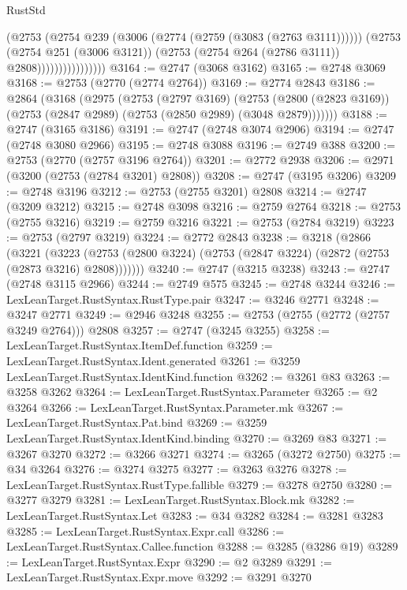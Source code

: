 \begin{lexlean}{RustStd}
\begin{coremodule}
                              (@2753
                                (@2754 @239 (@3006 (@2774 (@2759 (@3083 (@2763 @3111))))))
                                (@2753
                                  (@2754 @251 (@3006 @3121))
                                  (@2753 (@2754 @264 (@2786 @3111)) @2808))))))))))))))))
@3164 := @2747 (@3068 @3162)
@3165 := @2748 @3069
@3168 := @2753 (@2770 (@2774 @2764))
@3169 := @2774 @2843
@3186 := @2864
    (@3168
      (@2975
        (@2753
          (@2797 @3169)
          (@2753 (@2800 (@2823 @3169)) (@2753 (@2847 @2989) (@2753 (@2850 @2989) (@3048 @2879)))))))
@3188 := @2747 (@3165 @3186)
@3191 := @2747 (@2748 @3074 @2906)
@3194 := @2747 (@2748 @3080 @2966)
@3195 := @2748 @3088
@3196 := @2749 @388
@3200 := @2753 (@2770 (@2757 @3196 @2764))
@3201 := @2772 @2938
@3206 := @2971 (@3200 (@2753 (@2784 @3201) @2808))
@3208 := @2747 (@3195 @3206)
@3209 := @2748 @3196
@3212 := @2753 (@2755 @3201) @2808
@3214 := @2747 (@3209 @3212)
@3215 := @2748 @3098
@3216 := @2759 @2764
@3218 := @2753 (@2755 @3216)
@3219 := @2759 @3216
@3221 := @2753 (@2784 @3219)
@3223 := @2753 (@2797 @3219)
@3224 := @2772 @2843
@3238 := @3218
    (@2866
      (@3221
        (@3223 (@2753 (@2800 @3224) (@2753 (@2847 @3224) (@2872 (@2753 (@2873 @3216) @2808)))))))
@3240 := @2747 (@3215 @3238)
@3243 := @2747 (@2748 @3115 @2966)
@3244 := @2749 @575
@3245 := @2748 @3244
@3246 := LexLeanTarget.RustSyntax.RustType.pair
@3247 := @3246 @2771
@3248 := @3247 @2771
@3249 := @2946 @3248
@3255 := @2753 (@2755 (@2772 (@2757 @3249 @2764))) @2808
@3257 := @2747 (@3245 @3255)
@3258 := LexLeanTarget.RustSyntax.ItemDef.function
@3259 := LexLeanTarget.RustSyntax.Ident.generated
@3261 := @3259 LexLeanTarget.RustSyntax.IdentKind.function
@3262 := @3261 @83
@3263 := @3258 @3262
@3264 := LexLeanTarget.RustSyntax.Parameter
@3265 := @2 @3264
@3266 := LexLeanTarget.RustSyntax.Parameter.mk
@3267 := LexLeanTarget.RustSyntax.Pat.bind
@3269 := @3259 LexLeanTarget.RustSyntax.IdentKind.binding
@3270 := @3269 @83
@3271 := @3267 @3270
@3272 := @3266 @3271
@3274 := @3265 (@3272 @2750)
@3275 := @34 @3264
@3276 := @3274 @3275
@3277 := @3263 @3276
@3278 := LexLeanTarget.RustSyntax.RustType.fallible
@3279 := @3278 @2750
@3280 := @3277 @3279
@3281 := LexLeanTarget.RustSyntax.Block.mk
@3282 := LexLeanTarget.RustSyntax.Let
@3283 := @34 @3282
@3284 := @3281 @3283
@3285 := LexLeanTarget.RustSyntax.Expr.call
@3286 := LexLeanTarget.RustSyntax.Callee.function
@3288 := @3285 (@3286 @19)
@3289 := LexLeanTarget.RustSyntax.Expr
@3290 := @2 @3289
@3291 := LexLeanTarget.RustSyntax.Expr.move
@3292 := @3291 @3270

\end{coremodule}
\end{lexlean}
